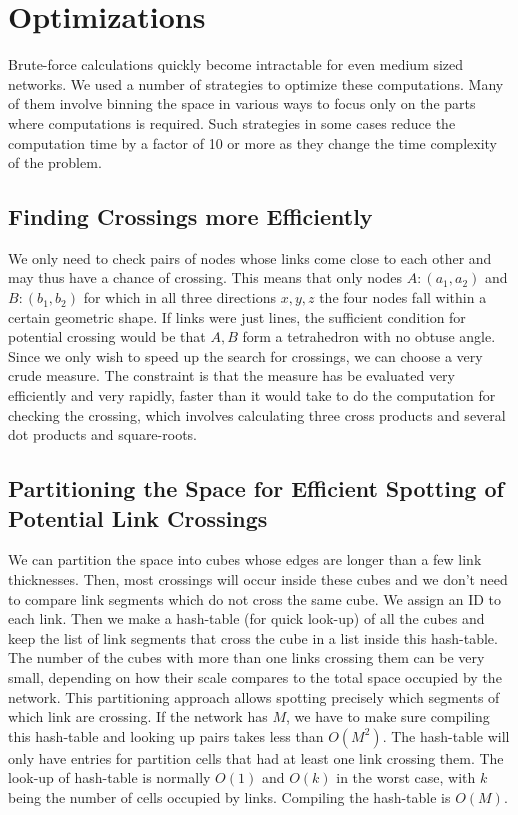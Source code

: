 \documentclass[linenumbers,endfloats,nofootinbib,preprint,floatfix,titlepage,superscriptaddress]{revtex4-1} %
\begin{document}
\section{Optimizations}
Brute-force calculations quickly become intractable for even medium sized networks. We used a number of strategies to optimize these computations. Many of them involve binning the space in various ways to focus only on the parts where computations is required. Such strategies in some cases reduce the computation time by a factor of 10 or more as they change the time complexity of the problem. 

\subsection{Finding Crossings more Efficiently}
We only need to check pairs of nodes whose links come close to each other and may thus have a chance of crossing. 
This means that only nodes $A:(a_1,a_2)$ and $B:(b_1,b_2)$ for which in all three  directions $x,y,z$ the four nodes fall within a certain geometric shape. 
If links were just lines, the sufficient condition for potential crossing would be that $A,B$ form a tetrahedron with no obtuse angle. 
Since we only wish to speed up the search for crossings, we can choose a very crude measure. 
The constraint is that the measure has be evaluated very efficiently and very rapidly, faster than it would take to do the computation for checking the crossing, which involves calculating three cross products and several dot products and square-roots. 

\subsection{ Partitioning the Space for Efficient Spotting of Potential Link Crossings}
We can partition the space into cubes whose edges are longer than a few link thicknesses. 
Then, most crossings will occur inside these cubes and we don't need to compare link segments which do not cross the same cube. 
We assign an ID to each link. 
Then we make a hash-table (for quick look-up) of all the cubes and keep the list of link segments that cross the cube in a list inside this hash-table. %
The number of the cubes with more than one links crossing them can be very small, depending on how their scale compares to the total space occupied by the network. 
This partitioning approach allows spotting precisely which segments of which link are crossing. 
If the network has $M$, we have to make sure compiling this hash-table and looking up pairs takes less than $O(M^2)$. 
The hash-table will only have entries for partition cells that had at least one link crossing them. 
The look-up of hash-table is normally $O(1)$ and $O(k)$ in the worst case, with $k$ being the number of cells occupied by links.  
Compiling the hash-table is $O(M)$. 
\end{document}
